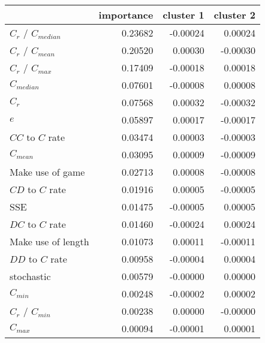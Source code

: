 \begin{tabular}{lrrr}
\toprule
{} &  importance &  cluster 1 &  cluster 2 \\
\midrule
$C_r$ / $C_{median}$ &     0.23682 &   -0.00024 &    0.00024 \\
$C_r$ / $C_{mean}$   &     0.20520 &    0.00030 &   -0.00030 \\
$C_r$ / $C_{max}$    &     0.17409 &   -0.00018 &    0.00018 \\
$C_{median}$         &     0.07601 &   -0.00008 &    0.00008 \\
$C_r$                &     0.07568 &    0.00032 &   -0.00032 \\
$e$                  &     0.05897 &    0.00017 &   -0.00017 \\
$CC$ to $C$ rate     &     0.03474 &    0.00003 &   -0.00003 \\
$C_{mean}$           &     0.03095 &    0.00009 &   -0.00009 \\
Make use of game     &     0.02713 &    0.00008 &   -0.00008 \\
$CD$ to $C$ rate     &     0.01916 &    0.00005 &   -0.00005 \\
SSE                  &     0.01475 &   -0.00005 &    0.00005 \\
$DC$ to $C$ rate     &     0.01460 &   -0.00024 &    0.00024 \\
Make use of length   &     0.01073 &    0.00011 &   -0.00011 \\
$DD$ to $C$ rate     &     0.00958 &   -0.00004 &    0.00004 \\
stochastic           &     0.00579 &   -0.00000 &    0.00000 \\
$C_{min}$            &     0.00248 &   -0.00002 &    0.00002 \\
$C_r$ / $C_{min}$    &     0.00238 &    0.00000 &   -0.00000 \\
$C_{max}$            &     0.00094 &   -0.00001 &    0.00001 \\
\bottomrule
\end{tabular}
